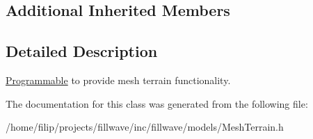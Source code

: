 \subsection*{Additional Inherited Members}


\subsection{Detailed Description}
\hyperlink{classflw_1_1flf_1_1Programmable}{Programmable} to provide mesh terrain functionality. 

The documentation for this class was generated from the following file\+:\begin{DoxyCompactItemize}
\item 
/home/filip/projects/fillwave/inc/fillwave/models/Mesh\+Terrain.\+h\end{DoxyCompactItemize}
